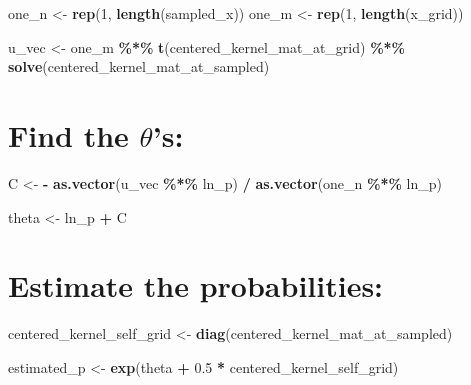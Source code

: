 \documentclass[
]{article}
\newenvironment{Shaded}{\begin{snugshade}}{\end{snugshade}}
\newcommand{\DecValTok}[1]{\textcolor[rgb]{0.00,0.00,0.81}{#1}}
\newcommand{\FloatTok}[1]{\textcolor[rgb]{0.00,0.00,0.81}{#1}}
\newcommand{\FunctionTok}[1]{\textcolor[rgb]{0.13,0.29,0.53}{\textbf{#1}}}
\newcommand{\NormalTok}[1]{#1}
\newcommand{\OtherTok}[1]{\textcolor[rgb]{0.56,0.35,0.01}{#1}}
\newcommand{\SpecialCharTok}[1]{\textcolor[rgb]{0.81,0.36,0.00}{\textbf{#1}}}
\begin{document}
\begin{Shaded}
\begin{Highlighting}[]
\NormalTok{one\_n }\OtherTok{\textless{}{-}} \FunctionTok{rep}\NormalTok{(}\DecValTok{1}\NormalTok{, }\FunctionTok{length}\NormalTok{(sampled\_x))}
\NormalTok{one\_m }\OtherTok{\textless{}{-}} \FunctionTok{rep}\NormalTok{(}\DecValTok{1}\NormalTok{, }\FunctionTok{length}\NormalTok{(x\_grid))}

\NormalTok{u\_vec }\OtherTok{\textless{}{-}}\NormalTok{  one\_m }\SpecialCharTok{\%*\%} \FunctionTok{t}\NormalTok{(centered\_kernel\_mat\_at\_grid) }\SpecialCharTok{\%*\%} \FunctionTok{solve}\NormalTok{(centered\_kernel\_mat\_at\_sampled)}
\end{Highlighting}
\end{Shaded}

\section{\texorpdfstring{Find the
\(\theta\)'s:}{Find the \textbackslash theta's:}}\label{find-the-thetas}

\begin{Shaded}
\begin{Highlighting}[]
\NormalTok{C }\OtherTok{\textless{}{-}}  \SpecialCharTok{{-}} \FunctionTok{as.vector}\NormalTok{(u\_vec }\SpecialCharTok{\%*\%}\NormalTok{ ln\_p) }\SpecialCharTok{/} \FunctionTok{as.vector}\NormalTok{(one\_n }\SpecialCharTok{\%*\%}\NormalTok{ ln\_p)}

\NormalTok{theta }\OtherTok{\textless{}{-}}\NormalTok{ ln\_p }\SpecialCharTok{+}\NormalTok{ C}
\end{Highlighting}
\end{Shaded}

\section{Estimate the probabilities:}\label{estimate-the-probabilities}

\begin{Shaded}
\begin{Highlighting}[]
\NormalTok{centered\_kernel\_self\_grid }\OtherTok{\textless{}{-}} \FunctionTok{diag}\NormalTok{(centered\_kernel\_mat\_at\_sampled)}

\NormalTok{estimated\_p }\OtherTok{\textless{}{-}} \FunctionTok{exp}\NormalTok{(theta }\SpecialCharTok{+} \FloatTok{0.5} \SpecialCharTok{*}\NormalTok{ centered\_kernel\_self\_grid)}
\end{Highlighting}
\end{Shaded}
\end{document}
